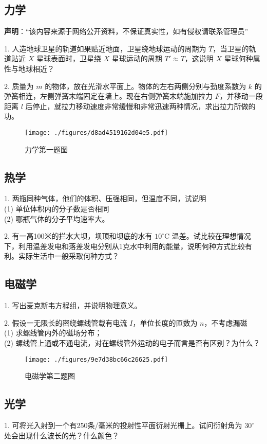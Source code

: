 \subsection{力学}
\textbf{声明}：“该内容来源于网络公开资料，不保证真实性，如有侵权请联系管理员”

1. 人造地球卫星的轨道如果贴近地面，卫星绕地球运动的周期为 $T$，当卫星的轨道贴近 $X$ 星球表面时，卫星绕 $X$ 星球运动的周期 $T' \approx T$，这说明 $X$ 星球何种属性与地球相近？

2. 质量为 $m$ 的物体，放在光滑水平面上。物体的左右两侧分别与劲度系数为 $k$ 的弹簧相连，左侧弹簧末端固定在墙上。现在右侧弹簧末端施加拉力 $F$，并移动一段距离 $l$ 后停止，就拉力移动速度非常缓慢和非常迅速两种情况，求出拉力所做的功。
\begin{figure}[ht]
\centering
\texttt{[image: ./figures/d8ad4519162d04e5.pdf]}
\caption{力学第一题图} \label{fig_NJU13_1}
\end{figure}
\subsection{热学}
1. 两瓶同种气体，他们的体积、压强相同，但温度不同，试说明\\
(1) 单位体积内的分子数是否相同\\
(2) 哪瓶气体的分子平均速率大。

2. 有一高100米的拦水大坝，坝顶和坝底的水有 $10^\circ\mathrm{C}$ 温差。试比较在理想情况下，利用温差发电和落差发电分别从1克水中利用的能量，说明何种方式比较有利。实际生活中一般采取何种方式？
\subsection{电磁学}
1. 写出麦克斯韦方程组，并说明物理意义。

2. 假设一无限长的密绕螺线管载有电流 $I$，单位长度的匝数为 $n$，不考虑漏磁\\
(1) 求螺线管内外的磁场分布；\\
(2) 螺线管上通或不通电流，对在螺线管外运动的电子而言是否有区别？为什么？
\begin{figure}[ht]
\centering
\texttt{[image: ./figures/9e7d38bc66c26625.pdf]}
\caption{电磁学第二题图} \label{fig_NJU13_2}
\end{figure}
\subsection{光学}
1. 可将光入射到一个有250条/毫米的投射性平面衍射光栅上。试问衍射角为 $30^\circ$ 处会出现什么波长的光？什么颜色？

